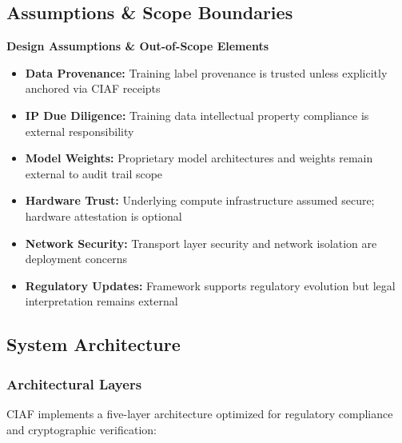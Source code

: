 \documentclass[12pt,a4paper]{article}
\begin{document}
\subsection{Assumptions \& Scope Boundaries}

\begin{infobox}
\textbf{Design Assumptions \& Out-of-Scope Elements}
\begin{itemize}
\item \textbf{Data Provenance:} Training label provenance is trusted unless explicitly anchored via CIAF receipts
\item \textbf{IP Due Diligence:} Training data intellectual property compliance is external responsibility
\item \textbf{Model Weights:} Proprietary model architectures and weights remain external to audit trail scope
\item \textbf{Hardware Trust:} Underlying compute infrastructure assumed secure; hardware attestation is optional
\item \textbf{Network Security:} Transport layer security and network isolation are deployment concerns
\item \textbf{Regulatory Updates:} Framework supports regulatory evolution but legal interpretation remains external
\end{itemize}
\end{infobox}

\subsection{System Architecture}

\subsubsection{Architectural Layers}

CIAF implements a five-layer architecture optimized for regulatory compliance and cryptographic verification:
\end{document}
